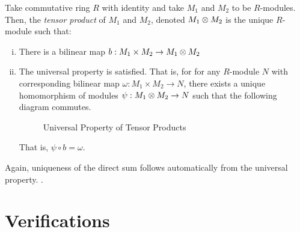 \documentclass[../sean_thesis.tex]{subfiles}
\begin{document}


\begin{definition}
	Take commutative ring $R$ with identity and take $M_1$ and $M_2$ to be $R$-modules. Then, the \emph{tensor product} of $M_1$ and $M_2$, denoted $M_1 \otimes M_2$ is the unique $R$-module such that:
\vspace{-\varparskip}
	\begin{enumerate}[(i)]
		\item There is a bilinear map $b: M_1 \times M_2 \to M_1 \otimes M_2$
		\item The universal property is satisfied. That is, for for any $R$-module $N$ with corresponding bilinear map $\omega: M_1 \times M_2 \to N$, there exists a unique homomorphism of modules $\psi: M_1 \otimes M_2 \to N$ such that the following diagram commutes.
		\begin{figure}[ht!]
			
			\caption{Universal Property of Tensor Products}
			\label{fig:tensor_prod_univ_property}
		\end{figure}
		That is, $\psi \circ b = \omega$.
	\end{enumerate}
\end{definition}

Again, uniqueness of the direct sum follows automatically from the universal property. .


\section{Verifications}

\end{document}
